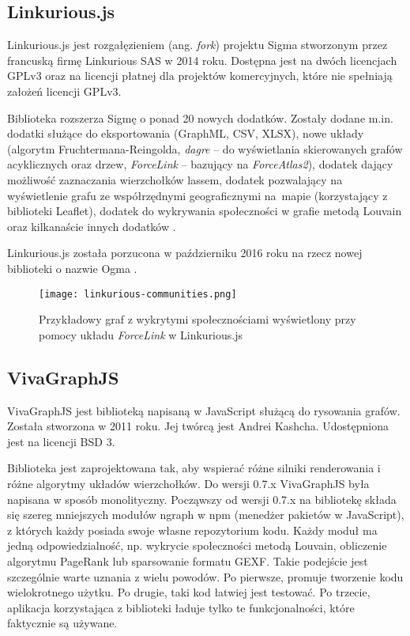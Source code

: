 \subsection{Linkurious.js}

Linkurious.js jest rozgałęzieniem (ang. \textit{fork}) projektu Sigma stworzonym przez francuską firmę Linkurious SAS w 2014 roku. Dostępna jest na dwóch licencjach GPLv3 oraz na licencji płatnej dla projektów komercyjnych, które nie spełniają założeń licencji GPLv3. 

Biblioteka rozszerza Sigmę o ponad 20 nowych dodatków. Zostały dodane m.in. dodatki służące do eksportowania (GraphML, CSV, XLSX), nowe układy (algorytm Fruchtermana-Reingolda, \textit{dagre} -- do wyświetlania skierowanych grafów acyklicznych oraz drzew, \textit{ForceLink} -- bazujący na \textit{ForceAtlas2}), dodatek dający możliwość zaznaczania wierzchołków lassem, dodatek pozwalający na wyświetlenie grafu ze współrzędnymi geograficznymi na~mapie (korzystający z biblioteki Leaflet), dodatek do wykrywania społeczności w grafie metodą Louvain oraz kilkanaście innych dodatków \cite{linkurious-diff}. 

Linkurious.js została porzucona w październiku 2016 roku na rzecz nowej biblioteki o nazwie Ogma \cite{ogma}.

\bigskip

\begin{figure}[H]
\centering
\texttt{[image: linkurious-communities.png]}
\captionsetup{justification=centering}
\caption{Przykładowy graf z wykrytymi społecznościami wyświetlony przy pomocy układu \textit{ForceLink} w Linkurious.js}\label{fig:linkurious-communities}
\end{figure}

\subsection{VivaGraphJS}

VivaGraphJS jest biblioteką napisaną w JavaScript służącą do rysowania grafów. Została stworzona w 2011 roku. Jej twórcą jest Andrei Kashcha. Udostępniona jest na licencji BSD 3.

Biblioteka jest zaprojektowana tak, aby wspierać różne silniki renderowania i różne algorytmy układów wierzchołków. Do wersji 0.7.x VivaGraphJS była napisana w sposób monolityczny. Począwszy od wersji 0.7.x na bibliotekę składa się szereg mniejszych modułów ngraph w npm (menedżer pakietów w JavaScript), z których każdy posiada swoje własne repozytorium kodu. Każdy moduł ma jedną odpowiedzialność, np. wykrycie społeczności metodą Louvain, obliczenie algorytmu PageRank lub sparsowanie formatu GEXF. Takie podejście jest szczególnie warte uznania z wielu powodów. Po pierwsze, promuje tworzenie kodu wielokrotnego użytku. Po drugie, taki kod łatwiej jest testować. Po trzecie, aplikacja korzystająca z biblioteki ładuje tylko te funkcjonalności, które faktycznie są używane. 

